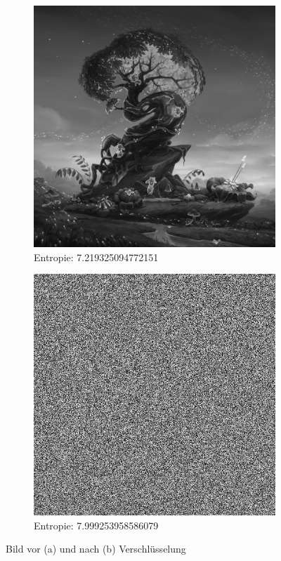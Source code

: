 \begin{figure}
	\centering

	\begin{subfigure}{0.35\textwidth}
		\includegraphics[width=\textwidth]{../1/3/gray_7.2193250947721515_fantasy_tree.jpg}
		\caption{Entropie: 7.219325094772151}
	\end{subfigure}
	\hfill
	\begin{subfigure}{0.35\textwidth}
		\includegraphics[width=\textwidth]{../1/3/encrypted_7.999253958586079_fantasy_tree.jpg}
		\caption{Entropie: 7.999253958586079}
	\end{subfigure}

	\caption{Bild vor (a) und nach (b) Verschlüsselung}
	\label{fig:fantasy}
\end{figure}

